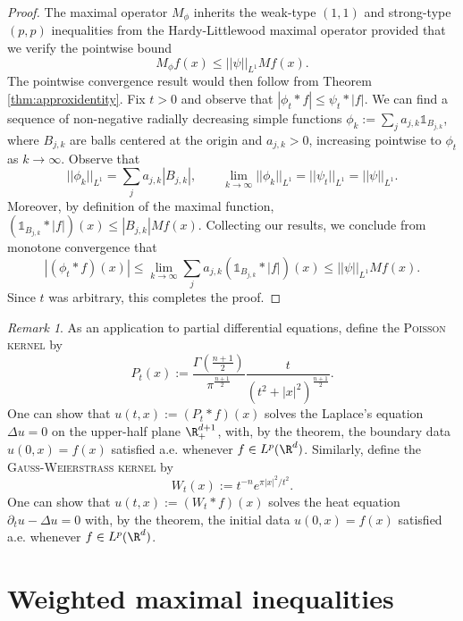 \documentclass[reqno]{amsart}
\theoremstyle{definition}
\theoremstyle{remark}
\newtheorem*{remark}{Remark}
\renewcommand{\emph}{\textsc}
\begin{document}
\begin{proof}
	The maximal operator $M_\phi$ inherits the weak-type $(1, 1)$ and strong-type $(p, p)$ inequalities from the Hardy-Littlewood maximal operator provided that we verify the pointwise bound
		\[ M_\phi f (x) \leq ||\psi||_{L^1} M f(x). \]
	The pointwise convergence result would then follow from Theorem \ref{thm:approxidentity}. 	Fix $t > 0$ and observe that $|\phi_t * f| \leq \psi_t * |f|$. We can find a sequence of non-negative radially decreasing simple functions $\phi_k := \sum_j a_{j, k} \mathbb 1_{B_{j, k}}$, where $B_{j, k}$ are balls centered at the origin and $a_{j, k} > 0$, increasing pointwise to $\phi_t$ as $k \to \infty$. Observe that
		\[ ||\phi_{k} ||_{L^1} = \sum_j a_{j , k} |B_{j , k}|, \qquad \lim_{k \to \infty} ||\phi_k||_{L^1} = ||\psi_t||_{L^1} = ||\psi||_{L^1}. \]
	Moreover, by definition of the maximal function, $(\mathbb 1_{B_{j , k}} * |f|) (x)\leq |B_{j, k}| M f(x)$. Collecting our results, we conclude from monotone convergence that
		\[ |(\phi_t * f)(x)| \leq \lim_{k \to \infty} \sum_j a_{j ,k} (\mathbb 1_{B_{j, k}} * |f|)(x) \leq ||\psi||_{L^1} Mf(x).  \]
	Since $t$ was arbitrary, this completes the proof. 	
\end{proof}

\begin{remark}
	As an application to partial differential equations, define the \emph{Poisson kernel} by 
		\[ P_t (x) := \frac{\Gamma \left( \frac{n + 1}{2} \right)}{\pi^{\frac{n + 1}{2}}} \frac{t}{(t^2 + |x|^2)^{\frac{n + 1}{2}}}. \]
	One can show that $u(t, x) := (P_t * f) (x)$ solves the Laplace's equation $\Delta u = 0$ on the upper-half plane $\R^{d + 1}_+$, with, by the theorem, the boundary data $u(0, x) = f(x)$ satisfied a.e. whenever $f \in L^p (\R^d)$. Similarly, define the \emph{Gauss-Weierstrass kernel} by 
		\[ W_t (x) := t^{-n} e^{\pi |x|^2/t^2}. \]
	One can show that $u(t, x) := (W_t * f) (x)$	solves the heat equation $\partial_t u - \Delta u = 0$ with, by the theorem, the initial data $u(0, x) = f(x)$ satisfied a.e. whenever $f \in L^p (\R^d)$. 
\end{remark}


\section{Weighted maximal inequalities}
\end{document}
